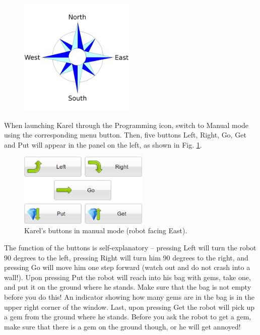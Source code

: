 \documentclass[article,A4,12pt]{llncs}
\begin{document}
\begin{figure}[!ht]
\begin{center}
\includegraphics[width=0.5\textwidth]{img/compass.png}
\vspace{-0mm}
\end{center}
\vspace{-1cm}
\end{figure}
\noindent
When launching Karel through the Programming icon, switch to Manual mode using the corresponding 
menu button. Then, five buttons Left, Right, Go, Get and Put will appear in the panel on the left,
as shown in Fig. \ref{fig:buttons}.

\newpage

\begin{figure}[!ht]
\begin{center}
\includegraphics[width=6.2cm]{img/buttons-all.png}
\vspace{-0mm}
\caption{Karel's buttons in manual mode (robot facing East).}
\label{fig:buttons}
\end{center}
\end{figure}
\noindent
The function of the buttons is self-explanatory -- pressing Left will turn the robot 90 degrees to the left,
pressing Right will turn him 90 degrees to the right, and pressing Go will move him one step forward 
(watch out and do not crash into a wall!). Upon pressing Put the robot will reach into his bag with gems, 
take one, and put it on the ground where he stands. Make sure that the bag is not empty before you do this!
An indicator showing how many gems are in the bag is in the upper right corner of the window. Last, upon pressing 
Get the robot will pick up a gem from the ground where he stands. Before you ask the robot to get a gem,
make sure that there is a gem on the ground though, or he will get annoyed!
\end{document}
